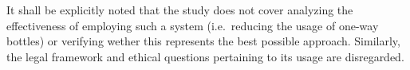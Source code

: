It shall be explicitly noted that the study does not cover analyzing the effectiveness of employing such a system (i.e.~reducing the usage of one-way bottles) or verifying wether this represents the best possible approach. Similarly, the legal framework and ethical questions pertaining to its usage are disregarded.




%
%
%
%
%

